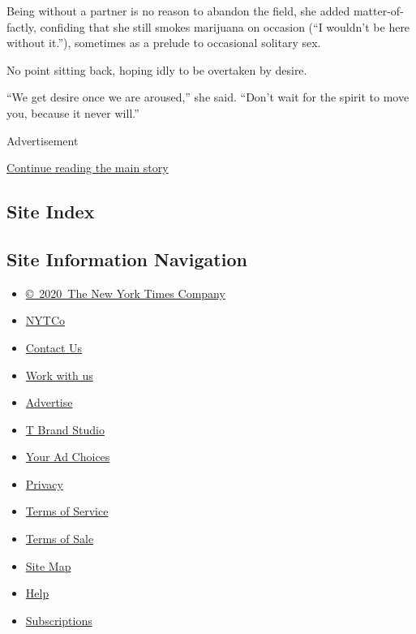 Being without a partner is no reason to abandon the field, she added
matter-of-factly, confiding that she still smokes marijuana on occasion
(``I wouldn't be here without it.''), sometimes as a prelude to
occasional solitary sex.

No point sitting back, hoping idly to be overtaken by desire.

``We get desire once we are aroused,'' she said. ``Don't wait for the
spirit to move you, because it never will.''

Advertisement

\protect\hyperlink{after-bottom}{Continue reading the main story}

\hypertarget{site-index}{%
\subsection{Site Index}\label{site-index}}

\hypertarget{site-information-navigation}{%
\subsection{Site Information
Navigation}\label{site-information-navigation}}

\begin{itemize}
\tightlist
\item
  \href{https://help.nytimes3xbfgragh.onion/hc/en-us/articles/115014792127-Copyright-notice}{©~2020~The
  New York Times Company}
\end{itemize}

\begin{itemize}
\tightlist
\item
  \href{https://www.nytco.com/}{NYTCo}
\item
  \href{https://help.nytimes3xbfgragh.onion/hc/en-us/articles/115015385887-Contact-Us}{Contact
  Us}
\item
  \href{https://www.nytco.com/careers/}{Work with us}
\item
  \href{https://nytmediakit.com/}{Advertise}
\item
  \href{http://www.tbrandstudio.com/}{T Brand Studio}
\item
  \href{https://www.nytimes3xbfgragh.onion/privacy/cookie-policy\#how-do-i-manage-trackers}{Your
  Ad Choices}
\item
  \href{https://www.nytimes3xbfgragh.onion/privacy}{Privacy}
\item
  \href{https://help.nytimes3xbfgragh.onion/hc/en-us/articles/115014893428-Terms-of-service}{Terms
  of Service}
\item
  \href{https://help.nytimes3xbfgragh.onion/hc/en-us/articles/115014893968-Terms-of-sale}{Terms
  of Sale}
\item
  \href{https://spiderbites.nytimes3xbfgragh.onion}{Site Map}
\item
  \href{https://help.nytimes3xbfgragh.onion/hc/en-us}{Help}
\item
  \href{https://www.nytimes3xbfgragh.onion/subscription?campaignId=37WXW}{Subscriptions}
\end{itemize}
